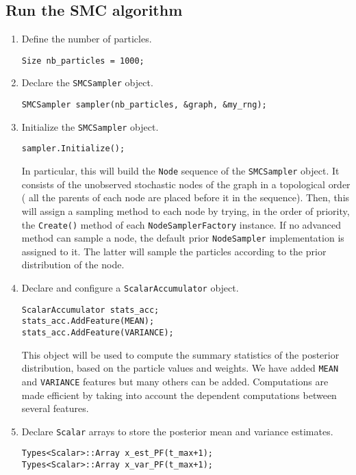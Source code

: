 \subsection{Run the SMC algorithm}

\begin{enumerate}
 \item Define the number of particles.
\begin{lstlisting}
Size nb_particles = 1000;
\end{lstlisting}


 \item Declare the \texttt{SMCSampler} object.
\begin{lstlisting}
SMCSampler sampler(nb_particles, &graph, &my_rng);
\end{lstlisting}


 \item Initialize the \texttt{SMCSampler} object.
\begin{lstlisting}
sampler.Initialize();
\end{lstlisting}
In particular, this will build the \texttt{Node} sequence of the \texttt{SMCSampler} object. It consists of the unobserved stochastic nodes of the graph in a topological order (\ie{} all the parents of each node are placed before it in the sequence). Then, this will assign a sampling method to each node by trying, in the order of priority, the \texttt{Create()} method of each \texttt{NodeSamplerFactory} instance. If no advanced method can sample a node, the default prior \texttt{NodeSampler} implementation is assigned to it. The latter will sample the particles according to the prior distribution of the node.

 \item Declare and configure a \texttt{ScalarAccumulator} object.
\begin{lstlisting}
ScalarAccumulator stats_acc;
stats_acc.AddFeature(MEAN);
stats_acc.AddFeature(VARIANCE);
\end{lstlisting}
This object will be used to compute the summary statistics of the posterior distribution, based on the particle values and weights. We have added \texttt{MEAN} and \texttt{VARIANCE} features but many others can be added. Computations are made efficient by taking into account the dependent computations between several features.


 \item Declare \texttt{Scalar} arrays to store the posterior mean and variance estimates.
\begin{lstlisting}
Types<Scalar>::Array x_est_PF(t_max+1);
Types<Scalar>::Array x_var_PF(t_max+1);
\end{lstlisting}



\end{enumerate}
